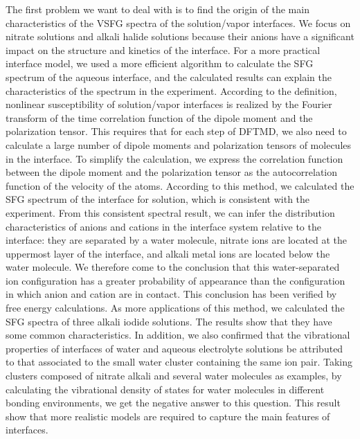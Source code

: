The first problem we want to deal with is to find the origin of the main characteristics of the
VSFG spectra of the solution/vapor interfaces.
We focus on nitrate solutions and alkali halide solutions because their anions have a significant impact on the structure and kinetics of the interface.
For a more practical interface model, we used a more efficient algorithm to calculate the SFG spectrum of the aqueous interface, 
and the calculated results can explain the characteristics of the spectrum in the experiment. 
According to the definition, nonlinear susceptibility of solution/vapor interfaces is realized by the Fourier transform of 
the time correlation function of the dipole moment and the polarization tensor. This requires that for each step of DFTMD, 
we also need to calculate a large number of dipole moments and polarization tensors of molecules in the interface. 
To simplify the calculation, we express the correlation function between the dipole moment and the polarization tensor 
as the autocorrelation function of the velocity of the atoms. According to this method, we calculated the SFG spectrum of the interface for \LiN solution,
which is consistent with the experiment. From this consistent spectral result, we can infer the distribution characteristics of anions 
and cations in the interface system relative to the interface: they are separated by a water molecule, nitrate ions are located at the uppermost layer of the interface, 
and alkali metal ions are located below the water molecule. We therefore come to the conclusion that this water-separated ion configuration 
has a greater probability of appearance than the configuration in which anion and cation are in contact.
This conclusion has been verified by free energy calculations. 
As more applications of this method, we calculated the SFG spectra of three alkali iodide solutions. 
The results show that they have some common characteristics. 
In addition, we also confirmed that the vibrational properties of interfaces of water and aqueous electrolyte solutions be attributed to 
that associated to the small water cluster containing the same ion pair.
Taking clusters composed of nitrate alkali and several water molecules as examples, by calculating the vibrational density of states 
for water molecules in different bonding environments, we get the negative answer to this question. 
This result show that more realistic models are required to capture the main features of interfaces.



